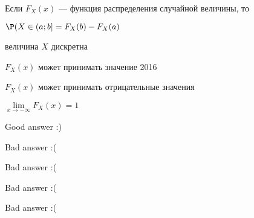 
\begin{question}
Если \(F_X(x)\) --- функция распределения случайной величины, то
\begin{answerlist}
  \item \(\P(X \in (a;b] = F_X(b) - F_X(a)\)
  \item величина \(X\) дискретна
  \item \(F_X(x)\) может принимать значение 2016
  \item \(F_X(x)\) может принимать отрицательные значения
  \item \(\lim\limits_{x \rightarrow -\infty} F_X(x) = 1\)
\end{answerlist}
\end{question}

\begin{solution}
\begin{answerlist}
  \item Good answer :)
  \item Bad answer :(
  \item Bad answer :(
  \item Bad answer :(
  \item Bad answer :(
\end{answerlist}
\end{solution}

